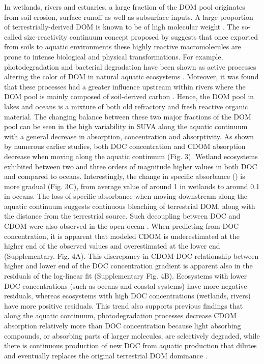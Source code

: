 In wetlands, rivers and estuaries, a large fraction of the DOM pool originates from soil erosion, surface runoff \citep{Massicotte2011EA, Lambert2015a} as well as subsurface inputs. A large proportion of terrestrially-derived DOM is known to be of high molecular weight \citep{Heinz2015}. The so-called size-reactivity continuum concept proposed by \citet{Amon1996} suggests that once exported from soils to aquatic environments these highly reactive macromolecules are prone to intense biological and physical transformations. For example, photodegradation and bacterial degradation have been shown as active processes altering the color of DOM in natural aquatic ecosystems \citep{Moran2000, Helms2014}. Moreover, it was found that these processes had a greater influence upstream within rivers where the DOM pool is mainly composed of soil-derived carbon \citep{Weyhenmeyer2012, Seidel2015}. Hence, the DOM pool in lakes and oceans is a mixture of both old refractory and fresh reactive organic material. The changing balance between these two major fractions of the DOM pool can be seen in the high variability in SUVA along the aquatic continuum with a general decrease in absorption, concentration and absorptivity. As shown by numerous earlier studies, both DOC concentration and CDOM absorption decrease when moving along the aquatic continuum (Fig. 3). Wetland ecosystems exhibited between two and three orders of magnitude higher values in both DOC and  compared to oceans. Interestingly, the change in specific absorbance () is more gradual (Fig. 3C), from average value of around 1 in wetlands to around 0.1 \suvagram in oceans. The loss of specific absorbance when moving downstream along the aquatic continuum suggests continuous bleaching of terrestrial DOM, along with the distance from the terrestrial source. Such decoupling between DOC and CDOM were also observed in the open ocean \citep{Nelson2002}. When predicting  from DOC concentration, it is apparent that modeled CDOM is underestimated at the higher end of the observed values and overestimated at the lower end (Supplementary. Fig. 4A). This discrepancy in CDOM-DOC relationship between higher and lower end of the DOC concentration gradient is apparent also in the residuals of the log-linear fit (Supplementary Fig. 4B). Ecosystems with lower DOC concentrations (such as oceans and coastal systems) have more negative residuals, whereas ecosystems with high DOC concentrations (wetlands, rivers) have more positive residuals. This trend also supports previous findings that along the aquatic continuum, photodegradation processes decrease CDOM absorption relatively more than DOC concentration \citep{Vahatalo2004} because light absorbing compounds, or absorbing parts of larger molecules, are selectively degraded, while there is continuous production of new DOC from aquatic production that dilutes and eventually replaces the original terrestrial DOM dominance \citep{Markager2011}.

